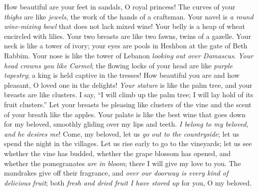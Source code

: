\begin{biblechapter} %
 How beautiful are your feet in sandals, 
O royal princess! 
The curves of your \textit{thighs} are like \textit{jewels}, 
the work of the hands of a craftsman.
\verse Your navel is \textit{a round wine-mixing bowl} 
that does not lack mixed wine! 
Your belly is a heap of wheat 
encircled with lilies.
\verse Your two breasts are like two fawns, 
twins of a gazelle.
\verse Your neck is like a tower of ivory; 
your eyes are pools in Heshbon at the gate of Beth Rabbim. 
Your nose is like the tower of Lebanon 
\textit{looking out over Damascus}.
\verse \textit{Your head crowns you like Carmel}; 
the flowing locks of your head are like \textit{purple tapestry}; 
a king is held captive in the tresses!
\verse How beautiful you are and how pleasant, 
O loved one in the delights!
\verse \textit{Your stature} is like the palm tree, 
and your breasts are like clusters.
\verse I say, “I will climb up the palm tree; 
I will lay hold of its fruit clusters.” 
Let your breasts be pleasing like clusters of the vine 
and the scent of your breath like the apples.
\verse Your palate is like the best wine that goes down for my beloved, 
smoothly gliding over my lips and teeth.
 \textit{I belong to my beloved}, 
\textit{and he desires me}!
 Come, my beloved, let us \textit{go out to the countryside}; 
let us spend the night in the villages.
\verse Let us rise early to go to the vineyards; 
let us see whether the vine has budded, 
whether the grape blossom has opened, 
and whether the pomegranates \textit{are in bloom}; 
there I will give my love to you.
\verse The mandrakes give off their fragrance, 
and \textit{over our doorway is every kind of delicious fruit}; 
both \textit{fresh and dried fruit I have stored up} for you, O my beloved.
\end{biblechapter}

